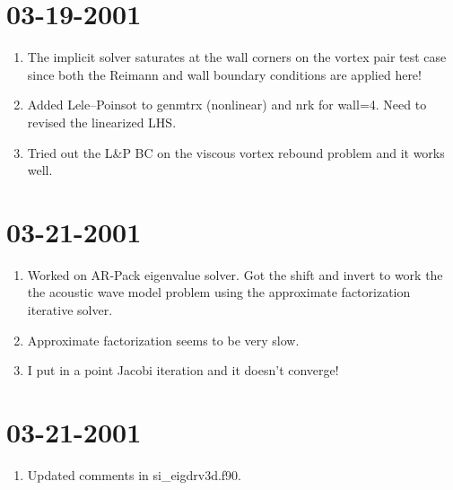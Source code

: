 \documentclass[12pt]{article}
\begin{document}
\section*{03-19-2001}

\begin{enumerate}

\item The implicit solver saturates at the wall corners on the vortex pair
test case since both the Reimann and wall boundary conditions are applied
here!

\item Added Lele--Poinsot to genmtrx (nonlinear) and nrk for wall=4.  Need
to revised the linearized LHS.

\item Tried out the L\&P BC on the viscous vortex rebound problem and it works
well.

\end{enumerate}

\section*{03-21-2001}

\begin{enumerate}

\item Worked on AR-Pack eigenvalue solver.  Got the shift and invert to work
the the acoustic wave model problem using the approximate factorization
iterative solver.

\item Approximate factorization seems to be very slow.

\item I put in a point Jacobi iteration and it doesn't converge!

\end{enumerate}

\section*{03-21-2001}

\begin{enumerate}

\item Updated comments in si\_eigdrv3d.f90.

\end{enumerate}
\end{document}
